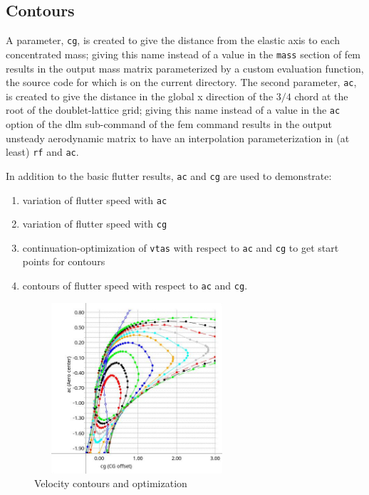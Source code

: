 \documentclass[11pt,openany,twoside]{book}
\numberwithin{equation}{section}		%
\newcommand{\Cmd}[1]{{\sf #1}}
\newcommand{\Code}[1]{{\small\tt #1}}
\begin{document}
\subsection{Contours}\label{ex:goland-contour}
A parameter, \Code{cg}, is created to give the distance from the elastic
axis to each concentrated mass; giving this name instead of a value
in the \Code{mass} section of \Cmd{fem} results in the output mass matrix
parameterized by a custom evaluation function, the source code for
which is on the current directory.
The second parameter, \Code{ac}, is created to give the distance in
the global x direction of the $3/4$ chord at the root of the doublet-lattice
grid; giving this name instead of a value in the \Code{ac} option of
the \Cmd{dlm} sub-command of the \Cmd{fem} command results in the output
unsteady aerodynamic matrix to have an interpolation parameterization
in (at least) \Code{rf} and \Code{ac}.
\par
In addition to the basic flutter results, \Code{ac} and \Code{cg} are used
to demonstrate:
\begin{enumerate}
	\item variation of flutter speed with \Code{ac}
	\item variation of flutter speed with \Code{cg}
	\item continuation-optimization of \Code{vtas} with respect to \Code{ac}
	   and \Code{cg} to get start points for
		contours
	\item contours of flutter speed with respect to \Code{ac} and \Code{cg}.
\end{enumerate}

\begin{figure}[ht]
		\includegraphics[height=2.5in,width=3.0in]{goland-contour.jpg}
	\centering
	\caption{Velocity contours and optimization}\label{fig:goland-contour}
\end{figure}
\end{document}

